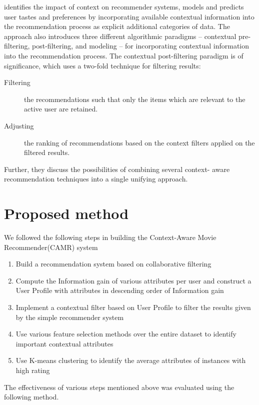 \documentclass{article}
\begin{document}
\cite{adomavicius2011context} identifies the impact of context on recommender systems, models and predicts user tastes and preferences by incorporating available contextual information into the recommendation process as explicit additional categories of data. The approach also introduces three different algorithmic paradigms – contextual pre-filtering, post-filtering, and modeling – for incorporating contextual information into the recommendation process. The contextual post-filtering paradigm is of significance, which uses a two-fold technique for filtering results:

\begin{description}
\item[Filtering] the recommendations such that only the items which are relevant to the active user are retained.
\item[Adjusting] the ranking of recommendations based on the context filters applied on the filtered results.
\end{description}

Further, they discuss the possibilities of combining several context- aware recommendation techniques into a single unifying approach.

\section{Proposed method}

We followed the following steps in building the Context-Aware Movie Recommender(CAMR) system

\begin{enumerate}
\item Build a recommendation system based on collaborative filtering
\item Compute the Information gain of various attributes per user and construct a User Profile with attributes in descending order of Information gain 
\item Implement a contextual filter based on User Profile to filter the results given by the simple recommender system
\item Use various feature selection methods over the entire dataset to identify important contextual attributes
\item Use K-means clustering to identify the average attributes of instances with high rating
\end{enumerate}

The effectiveness of various steps mentioned above was evaluated using the following method.
\end{document}
